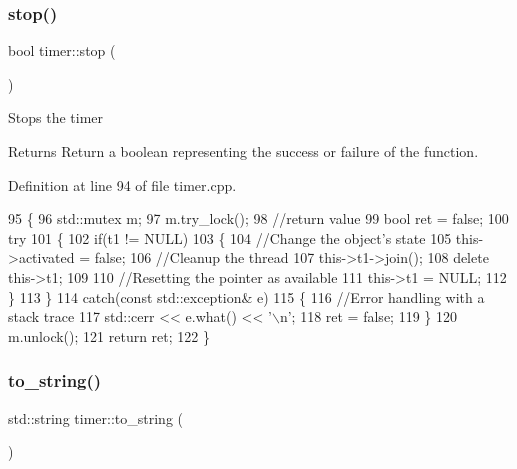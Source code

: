 \subsubsection{\texorpdfstring{stop()}{stop()}}
{\footnotesize\ttfamily bool timer\+::stop (\begin{DoxyParamCaption}{ }\end{DoxyParamCaption})}

Stops the timer \begin{DoxyReturn}{Returns}
Return a boolean representing the success or failure of the function. 
\end{DoxyReturn}


Definition at line 94 of file timer.\+cpp.


\begin{DoxyCode}
95 \{
96     std::mutex m;
97     m.try\_lock();
98     \textcolor{comment}{//return value}
99     \textcolor{keywordtype}{bool} ret = \textcolor{keyword}{false};
100     \textcolor{keywordflow}{try}
101     \{    
102         \textcolor{keywordflow}{if}(t1 != NULL)
103         \{
104             \textcolor{comment}{//Change the object's state}
105             this->activated = \textcolor{keyword}{false};
106             \textcolor{comment}{//Cleanup the thread}
107             this->t1->join();
108             \textcolor{keyword}{delete} this->t1;
109 
110             \textcolor{comment}{//Resetting the pointer as available}
111             this->t1 = NULL;
112         \}
113     \}
114     \textcolor{keywordflow}{catch}(\textcolor{keyword}{const} std::exception& e)
115     \{
116         \textcolor{comment}{//Error handling with a stack trace}
117         std::cerr << e.what() << \textcolor{charliteral}{'\(\backslash\)n'};
118         ret = \textcolor{keyword}{false};
119     \}
120     m.unlock();
121     \textcolor{keywordflow}{return} ret;
122 \}
\end{DoxyCode}
\mbox{\label{classtimer_a8c068c53de6269fc3ced75cf27bf4ea6}} 
\subsubsection{\texorpdfstring{to\+\_\+string()}{to\_string()}}
{\footnotesize\ttfamily std\+::string timer\+::to\+\_\+string (\begin{DoxyParamCaption}{ }\end{DoxyParamCaption})}

